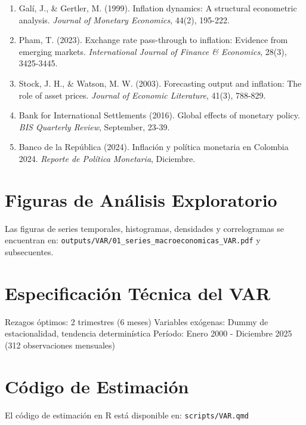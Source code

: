 \documentclass[12pt,a4paper]{article}
\begin{document}
\begin{enumerate}

\item Galí, J., \& Gertler, M. (1999). Inflation dynamics: A structural econometric analysis. \textit{Journal of Monetary Economics}, 44(2), 195-222.

\item Pham, T. (2023). Exchange rate pass-through to inflation: Evidence from emerging markets. \textit{International Journal of Finance \& Economics}, 28(3), 3425-3445.

\item Stock, J. H., \& Watson, M. W. (2003). Forecasting output and inflation: The role of asset prices. \textit{Journal of Economic Literature}, 41(3), 788-829.

\item Bank for International Settlements (2016). Global effects of monetary policy. \textit{BIS Quarterly Review}, September, 23-39.

\item Banco de la República (2024). Inflación y política monetaria en Colombia 2024. \textit{Reporte de Política Monetaria}, Diciembre.

\end{enumerate}

\appendix

\section{Figuras de Análisis Exploratorio}

Las figuras de series temporales, histogramas, densidades y correlogramas se encuentran en:
\texttt{outputs/VAR/01\_series\_macroeconomicas\_VAR.pdf} y subsecuentes.

\section{Especificación Técnica del VAR}

Rezagos óptimos: 2 trimestres (6 meses)
Variables exógenas: Dummy de estacionalidad, tendencia determinística
Período: Enero 2000 - Diciembre 2025 (312 observaciones mensuales)

\section{Código de Estimación}

El código de estimación en R está disponible en:
\texttt{scripts/VAR.qmd}
\end{document}
